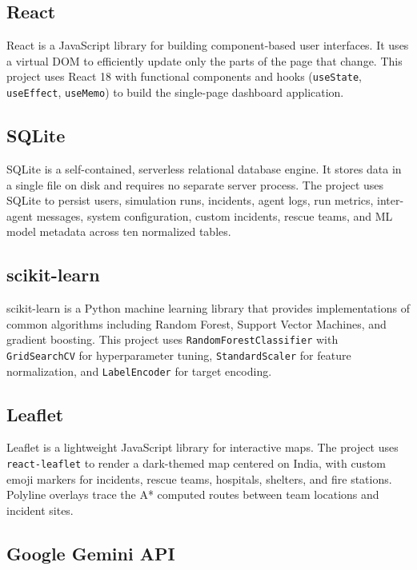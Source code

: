 \subsection{React}

React is a JavaScript library for building component-based user interfaces. It uses a virtual DOM to efficiently update only the parts of the page that change. This project uses React 18 with functional components and hooks (\texttt{useState}, \texttt{useEffect}, \texttt{useMemo}) to build the single-page dashboard application.

\subsection{SQLite}

SQLite is a self-contained, serverless relational database engine. It stores data in a single file on disk and requires no separate server process. The project uses SQLite to persist users, simulation runs, incidents, agent logs, run metrics, inter-agent messages, system configuration, custom incidents, rescue teams, and ML model metadata across ten normalized tables.

\subsection{scikit-learn}

scikit-learn is a Python machine learning library that provides implementations of common algorithms including Random Forest, Support Vector Machines, and gradient boosting. This project uses \texttt{RandomForestClassifier} with \texttt{GridSearchCV} for hyperparameter tuning, \texttt{StandardScaler} for feature normalization, and \texttt{LabelEncoder} for target encoding.

\subsection{Leaflet}

Leaflet is a lightweight JavaScript library for interactive maps. The project uses \texttt{react-leaflet} to render a dark-themed map centered on India, with custom emoji markers for incidents, rescue teams, hospitals, shelters, and fire stations. Polyline overlays trace the A* computed routes between team locations and incident sites.

\subsection{Google Gemini API}

